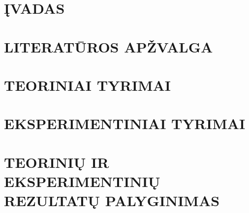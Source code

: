 \documentclass[12pt]{article}
\begin{document}
\section*{ĮVADAS}


    \blindtext                         %
    \par                               %
    \blindtext                         %

\newpage


\section{LITERATŪROS APŽVALGA}


\newpage


\section{TEORINIAI TYRIMAI}

    \blindtext[10]                     %

\newpage


\section{EKSPERIMENTINIAI TYRIMAI}


\newpage


\section{TEORINIŲ IR EKSPERIMENTINIŲ REZULTATŲ PALYGINIMAS}
\end{document}
